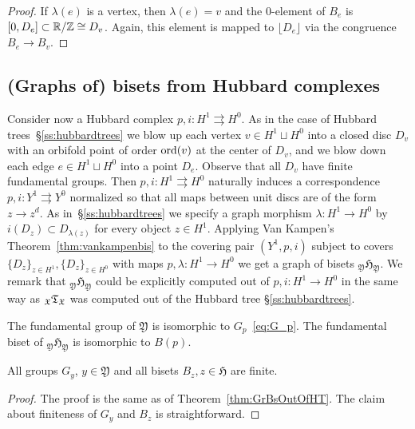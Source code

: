 \documentclass{amsart}
\begin{document}
\begin{proof}
  If $\lambda(e)$ is a vertex, then $\lambda(e)=v$ and the $0$-element of
  $B_e$ is $[0,D_{e}]\subset {\mathbb R}/{\mathbb Z} \cong D_v$. Again, this element is
  mapped to $\lfloor D_e \rfloor$ via the congruence $B_e\to B_v$.
\end{proof}

\subsection{(Graphs of) bisets from Hubbard complexes}\label{ss:hubbardcompl}
Consider now a Hubbard complex $p, i\colon H^1\rightrightarrows H^0$. As in
the case of Hubbard trees~\S\ref{ss:hubbardtrees} we blow up each vertex
$v\in H^1\sqcup H^0$ into a closed disc $D_v$ with an orbifold point of
order $\operatorname{ord}(v)$ at the center of $D_v$, and we blow down each edge $e\in
H^1\sqcup H^0$ into a point $D_e$. Observe that all $D_v$ have finite
fundamental groups. Then $p, i\colon H^1\rightrightarrows H^0$ naturally
induces a correspondence $p, i\colon Y^1\rightrightarrows Y^0$ normalized
so that all maps between unit discs are of the form $z\to z^d$. As
in~\S\ref{ss:hubbardtrees} we specify a graph morphism $\lambda\colon
H^1\to H^0$ by $i(D_z)\subset D_{\lambda(z)}$ for every object $z\in
H^1$. Applying Van Kampen's Theorem~\ref{thm:vankampenbis} to the covering
pair $(Y^1,p, i)$ subject to covers $\{D_z\}_{z\in H^1}, \{D_z\}_{z\in
  H^0}$ with maps $p, \lambda\colon H^1\to H^0$ we get a graph of bisets
${}_{\mathfrak Y}{\mathfrak H}_{\mathfrak Y}$. We remark that
${}_{\mathfrak Y}{\mathfrak H}_{\mathfrak Y}$ could be explicitly computed
out of $p,i\colon H^1\to H^0$ in the same way as ${}_{{\mathfrak X}}{\mathfrak
  T}_{{\mathfrak X}}$ was computed out of the Hubbard tree \S\ref{ss:hubbardtrees}.

\begin{thm}\label{thm:GrBsOutOfHC}
  The fundamental group of $\mathfrak Y$ is isomorphic to
  $G_p$~\eqref{eq:G_p}. The fundamental biset of ${}_{\mathfrak
    Y}{\mathfrak H}_{\mathfrak Y}$ is isomorphic to $B(p)$.

  All groups $G_y$, $y\in \mathfrak Y$ and all bisets $B_z, z\in \mathfrak
  H$ are finite.
\end{thm}
\begin{proof}
  The proof is the same as of Theorem~\ref{thm:GrBsOutOfHT}. The claim
  about finiteness of $G_y$ and $B_z$ is straightforward.
\end{proof}
\end{document}
